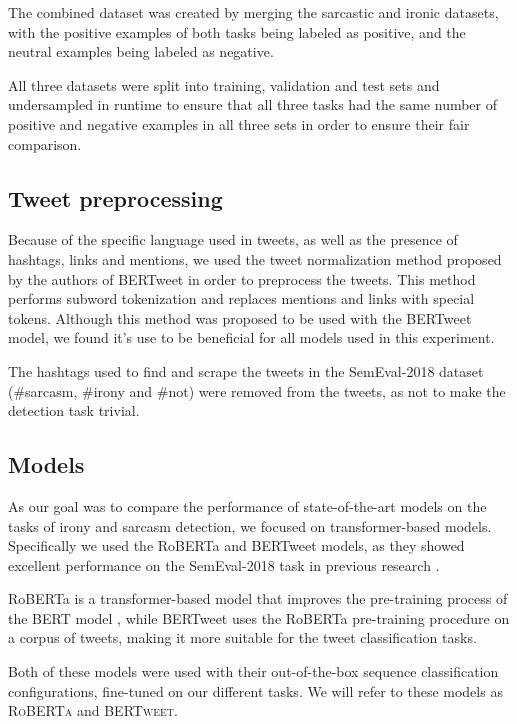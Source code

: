 \documentclass[10pt, a4paper]{article}
\begin{document}
The combined dataset was created by merging the sarcastic and ironic datasets, with the positive examples of both tasks
being labeled as positive, and the neutral examples being labeled as negative.

All three datasets were split into training, validation and test sets and undersampled in runtime to ensure that all three
tasks had the same number of positive and negative examples in all three sets in order to ensure their fair comparison.

\subsection{Tweet preprocessing}
Because of the specific language used in tweets, as well as the presence of hashtags, links and mentions, we used the
tweet normalization method proposed by the authors of BERTweet \citep{bertweet} in order to preprocess the tweets. This method
performs subword tokenization and replaces mentions and links with special tokens. Although this method was proposed to be 
used with the BERTweet model, we found it's use to be beneficial for all models used in this experiment.

The hashtags used to find and scrape the tweets in the SemEval-2018 dataset (\#sarcasm, \#irony and \#not) were removed
from the tweets, as not to make the detection task trivial.

\subsection{Models}\label{sec:models}

As our goal was to compare the performance of state-of-the-art models on the tasks of irony and sarcasm detection, we 
focused on transformer-based models. Specifically we used the RoBERTa \citep{roberta} and BERTweet \citep{bertweet} models,
as they showed excellent performance on the SemEval-2018 task in previous research \citep{transformers4irony-2020,bertweet}.

RoBERTa is a transformer-based model that improves the pre-training process of the BERT model \cite{devlin-etal-2019-bert},
while BERTweet uses the RoBERTa pre-training procedure on a corpus of tweets, making it more suitable for the tweet
classification tasks.

Both of these models were used with their out-of-the-box sequence classification configurations, fine-tuned on our 
different tasks. We will refer to these models as \textsc{RoBERTa} and \textsc{BERTweet}.
\end{document}
